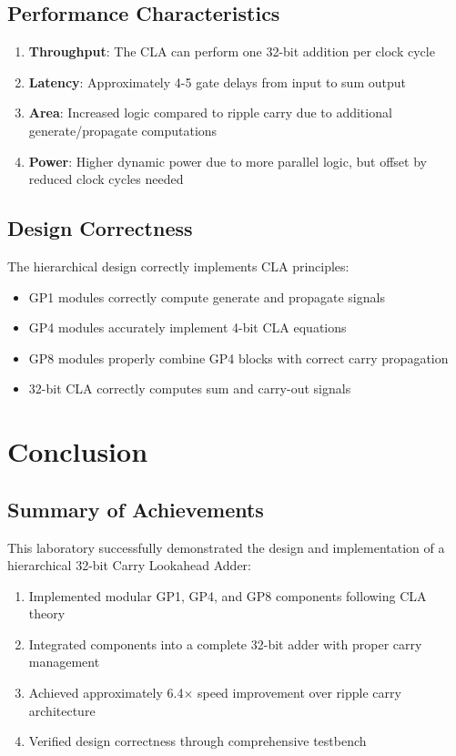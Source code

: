 \documentclass[a4paper, 11pt]{article}
\begin{document}
\begin{itemize}
\subsection{Performance Characteristics}

\begin{enumerate}
    \item \textbf{Throughput}: The CLA can perform one 32-bit addition per clock cycle
    \item \textbf{Latency}: Approximately 4-5 gate delays from input to sum output
    \item \textbf{Area}: Increased logic compared to ripple carry due to additional generate/propagate computations
    \item \textbf{Power}: Higher dynamic power due to more parallel logic, but offset by reduced clock cycles needed
\end{enumerate}

\subsection{Design Correctness}

The hierarchical design correctly implements CLA principles:

\begin{itemize}
    \item GP1 modules correctly compute generate and propagate signals
    \item GP4 modules accurately implement 4-bit CLA equations
    \item GP8 modules properly combine GP4 blocks with correct carry propagation
    \item 32-bit CLA correctly computes sum and carry-out signals
\end{itemize}

\section{Conclusion}

\subsection{Summary of Achievements}

This laboratory successfully demonstrated the design and implementation of a hierarchical 32-bit Carry Lookahead Adder:

\begin{enumerate}
    \item Implemented modular GP1, GP4, and GP8 components following CLA theory
    \item Integrated components into a complete 32-bit adder with proper carry management
    \item Achieved approximately 6.4$\times$ speed improvement over ripple carry architecture
    \item Verified design correctness through comprehensive testbench
\end{enumerate}


\end{itemize}
\end{document}
